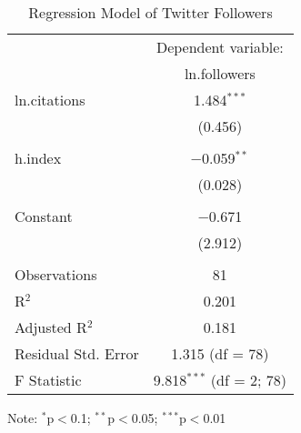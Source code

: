 \documentclass[12pt,english]{article}
\begin{document}
\begin{table}[ht]
  \caption{Regression Model of Twitter Followers} 
  \label{tab:inferential}
\centering
\begin{threeparttable}
\begin{tabular}{lc}
\toprule
                  & Dependent variable: \\
                  & ln.followers\\    
\midrule
    ln.citations  & 1.484$^{***}$ \\
                  & (0.456)\\
                  &  \\  
    h.index       & $-$0.059$^{**}$ \\
                  & (0.028) \\ 
                  &\\
    Constant      & $-$0.671 \\ 
                  & (2.912) \\
                  &\\
\midrule
   Observations   & 81 \\ 
   R$^{2}$        & 0.201 \\ 
 Adjusted R$^{2}$ & 0.181 \\ 
Residual Std. Error & 1.315 (df = 78) \\ 
F Statistic & 9.818$^{***}$ (df = 2; 78) \\ 
\bottomrule
\end{tabular}
\footnotesize Note: {$^{*}$p$<$0.1; $^{**}$p$<$0.05; $^{***}$p$<$0.01} 
\end{threeparttable}
\end{table}
\end{document}
